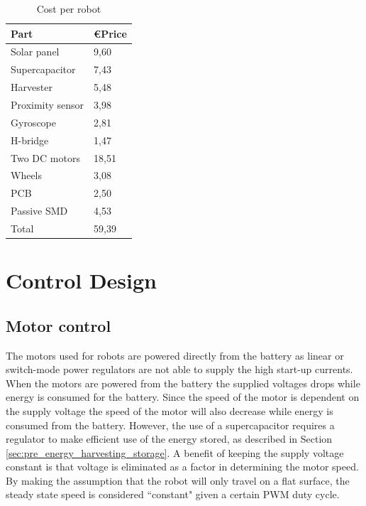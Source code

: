 \begin{table}[t]
	\centering
	\caption{Cost per robot}
	\label{tab:cost_robot}
	\begin{tabular}{|l|l|} 
		\hline
		Part & \euro Price \\
		\hline\hline
		Solar panel & 9,60\\
		Supercapacitor & 7,43\\
		Harvester & 5,48 \\
		Proximity sensor & 3,98 \\
		Gyroscope & 2,81\\	
		H-bridge & 1,47 \\
		Two DC motors & 18,51 \\
		Wheels & 3,08\\
		PCB & 2,50 \\
		Passive SMD & 4,53\\
		\hline \hline
		Total & 59,39 \\
		\hline
	\end{tabular}
\end{table}


\section{Control Design}

\subsection{Motor control}
\label{sec:calib_motors}

The motors used for robots are powered directly from the battery as linear or switch-mode power regulators are not able to supply the high start-up currents.
When the motors are powered from the battery the supplied voltages drops while energy is consumed for the battery.
Since the speed of the motor is dependent on the supply voltage the speed of the motor will also decrease while energy is consumed from the battery.
However, the use of a supercapacitor requires a regulator to make efficient use of the energy stored, as described in Section \ref{sec:pre_energy_harvesting_storage}.
A benefit of keeping the supply voltage constant is that voltage is eliminated as a factor in determining the motor speed.
By making the assumption that the robot will only travel on a flat surface, the steady state speed is considered ``constant" given a certain PWM duty cycle.


